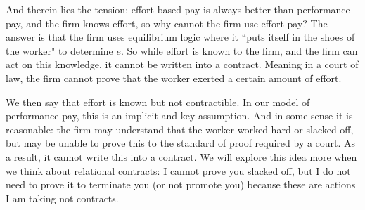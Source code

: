\documentclass{article}
\begin{document}
And therein lies the tension: effort-based pay is always better than performance pay, and the firm knows effort, so why cannot the firm use effort pay? The answer is that the firm uses equilibrium logic where it ``puts itself in the shoes of the worker" to determine $e$. So while effort is known to the firm, and the firm can act on this knowledge, it cannot be written into a contract. Meaning in a court of law, the firm cannot prove that the worker exerted a certain amount of effort.

We then say that effort is known but not contractible. In our model of performance pay, this is an implicit and key assumption. And in some sense it is reasonable: the firm may understand that the worker worked hard or slacked off, but may be unable to prove this to the standard of proof required by a court. As a result, it cannot write this into a contract. We will explore this idea more when we think about relational contracts: I cannot prove you slacked off, but I do not need to prove it to terminate you (or not promote you) because these are actions I am taking not contracts.
\end{document}
